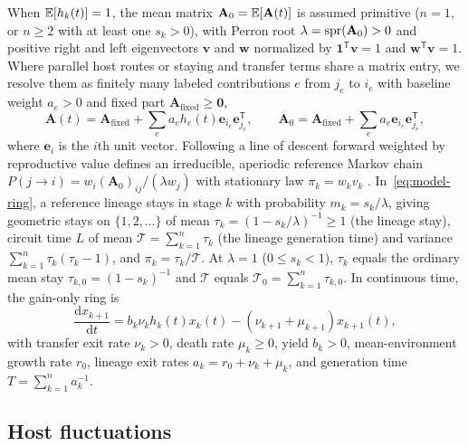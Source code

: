 When $\mathbb{E}[h_k(t)] = 1$, the mean matrix $\mathbf{A}_0 = \mathbb{E}[\mathbf{A}(t)]$ is assumed primitive ($n = 1$, or $n \ge 2$ with at least one $s_k > 0$), with Perron root $\lambda = \operatorname{spr}(\mathbf{A}_0) > 0$ and positive right and left eigenvectors $\mathbf{v}$ and $\mathbf{w}$ normalized by $\mathbf{1}^{\mathsf{T}}\mathbf{v} = 1$ and $\mathbf{w}^{\mathsf{T}}\mathbf{v} = 1$. Where parallel host routes or staying and transfer terms share a matrix entry, we resolve them as finitely many labeled contributions $e$ from $j_e$ to $i_e$ with baseline weight $a_e > 0$ and fixed part $\mathbf{A}_{\mathrm{fixed}} \ge \mathbf{0}$,
\begin{equation}\label{eq:model-edges}
\mathbf{A}(t) = \mathbf{A}_{\mathrm{fixed}} + \sum_e a_e h_e(t)\mathbf{e}_{i_e}\mathbf{e}_{j_e}^{\mathsf{T}}, \qquad \mathbf{A}_0 = \mathbf{A}_{\mathrm{fixed}} + \sum_e a_e \mathbf{e}_{i_e}\mathbf{e}_{j_e}^{\mathsf{T}},
\end{equation}
where $\mathbf{e}_i$ is the $i$th unit vector. Following a line of descent forward weighted by reproductive value defines an irreducible, aperiodic reference Markov chain $P(j \to i) = w_i (\mathbf{A}_0)_{ij}/(\lambda w_j)$ with stationary law $\pi_k = w_k v_k$ \citep{bienvenu2015,bienvenu2017}. In~\eqref{eq:model-ring}, a reference lineage stays in stage $k$ with probability $m_k = s_k/\lambda$, giving geometric stays on $\{1, 2, \dots\}$ of mean $\tau_k = (1 - s_k/\lambda)^{-1} \ge 1$ (the lineage stay), circuit time $L$ of mean $\mathcal{T} = \sum_{k=1}^n \tau_k$ (the lineage generation time) and variance $\sum_{k=1}^n \tau_k(\tau_k - 1)$, and $\pi_k = \tau_k/\mathcal{T}$. At $\lambda = 1$ ($0 \le s_k < 1$), $\tau_k$ equals the ordinary mean stay $\tau_{k,0} = (1 - s_k)^{-1}$ and $\mathcal{T}$ equals $\mathcal{T}_0 = \sum_{k=1}^n \tau_{k,0}$. In continuous time, the gain-only ring is
\begin{equation}\label{eq:model-ct}
\frac{\mathrm{d}x_{k+1}}{\mathrm{d}t} = b_k \nu_k h_k(t) x_k(t) - (\nu_{k+1} + \mu_{k+1})x_{k+1}(t),
\end{equation}
with transfer exit rate $\nu_k > 0$, death rate $\mu_k \ge 0$, yield $b_k > 0$, mean-environment growth rate $r_0$, lineage exit rates $a_k = r_0 + \nu_k + \mu_k$, and generation time $T = \sum_{k=1}^n a_k^{-1}$.

\subsection{Host fluctuations}\label{sec:model-hosts}

